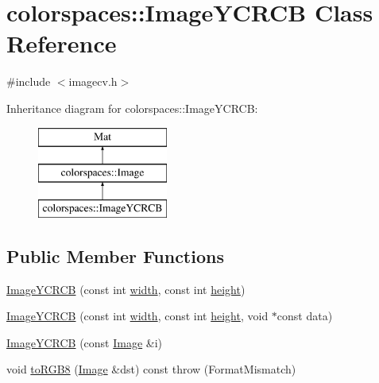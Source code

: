 \hypertarget{classcolorspaces_1_1_image_y_c_r_c_b}{}\section{colorspaces\+:\+:Image\+Y\+C\+R\+CB Class Reference}
\label{classcolorspaces_1_1_image_y_c_r_c_b}


{\ttfamily \#include $<$imagecv.\+h$>$}

Inheritance diagram for colorspaces\+:\+:Image\+Y\+C\+R\+CB\+:\begin{figure}[H]
\begin{center}
\leavevmode
\includegraphics[height=3.000000cm]{classcolorspaces_1_1_image_y_c_r_c_b}
\end{center}
\end{figure}
\subsection*{Public Member Functions}
\begin{DoxyCompactItemize}
\item 
\hyperlink{classcolorspaces_1_1_image_y_c_r_c_b_aa0307d1c32bb95b5730733058a4d10aa}{Image\+Y\+C\+R\+CB} (const int \hyperlink{classcolorspaces_1_1_image_ab80af7d4797110c23ed575b329ec7c4f}{width}, const int \hyperlink{classcolorspaces_1_1_image_a99a05ebd37f61215b2c3042ecaefdbfc}{height})
\item 
\hyperlink{classcolorspaces_1_1_image_y_c_r_c_b_a0f38ca1ce16bb80d8592682591d9eca4}{Image\+Y\+C\+R\+CB} (const int \hyperlink{classcolorspaces_1_1_image_ab80af7d4797110c23ed575b329ec7c4f}{width}, const int \hyperlink{classcolorspaces_1_1_image_a99a05ebd37f61215b2c3042ecaefdbfc}{height}, void $\ast$const data)
\item 
\hyperlink{classcolorspaces_1_1_image_y_c_r_c_b_a090033b73fd8260b084eaa5b06414e78}{Image\+Y\+C\+R\+CB} (const \hyperlink{classcolorspaces_1_1_image}{Image} \&i)
\item 
void \hyperlink{classcolorspaces_1_1_image_y_c_r_c_b_a9b6dbc86cb1e608f7d4f3f3b31f2f229}{to\+R\+G\+B8} (\hyperlink{classcolorspaces_1_1_image}{Image} \&dst) const  throw (\+Format\+Mismatch)
\end{DoxyCompactItemize}
